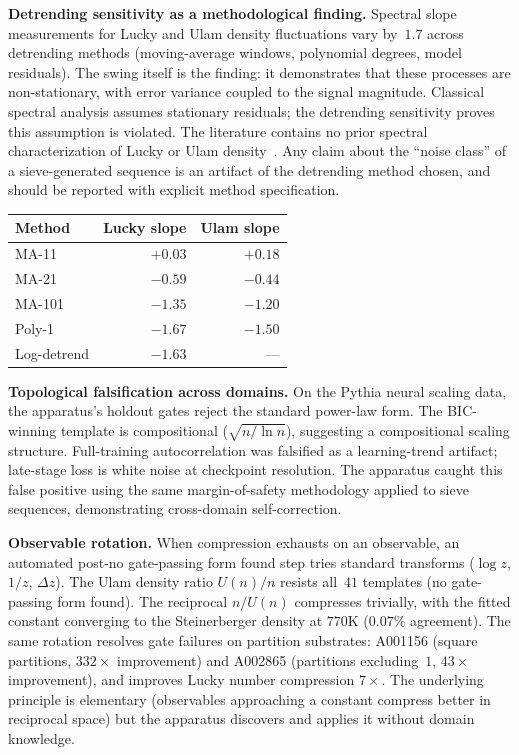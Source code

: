\documentclass[12pt]{article}
\begin{document}
\textbf{Detrending sensitivity as a methodological finding.} Spectral slope measurements for Lucky and Ulam density fluctuations vary by~$1.7$ across detrending methods (moving-average windows, polynomial degrees, model residuals). The swing itself is the finding: it demonstrates that these processes are non-stationary, with error variance coupled to the signal magnitude. Classical spectral analysis assumes stationary residuals; the detrending sensitivity proves this assumption is violated. The literature contains no prior spectral characterization of Lucky or Ulam density~\cite{wolf1997}. Any claim about the ``noise class'' of a sieve-generated sequence is an artifact of the detrending method chosen, and should be reported with explicit method specification.

\begin{center}
\small
\begin{tabular}{lrr}
\toprule
Method & Lucky slope & Ulam slope \\
\midrule
MA-11 & $+0.03$ & $+0.18$ \\
MA-21 & $-0.59$ & $-0.44$ \\
MA-101 & $-1.35$ & $-1.20$ \\
Poly-1 & $-1.67$ & $-1.50$ \\
Log-detrend & $-1.63$ & --- \\
\bottomrule
\end{tabular}
\end{center}

\textbf{Topological falsification across domains.} On the Pythia neural scaling data, the apparatus's holdout gates reject the standard power-law form. The BIC-winning template is compositional ($\sqrt{n/\ln n}$), suggesting a compositional scaling structure. Full-training autocorrelation was falsified as a learning-trend artifact; late-stage loss is white noise at checkpoint resolution. The apparatus caught this false positive using the same margin-of-safety methodology applied to sieve sequences, demonstrating cross-domain self-correction.

\textbf{Observable rotation.} When compression exhausts on an observable, an automated post-no gate-passing form found step tries standard transforms ($\log z$, $1/z$, $\Delta z$). The Ulam density ratio $U(n)/n$ resists all~$41$ templates (no gate-passing form found). The reciprocal $n/U(n)$ compresses trivially, with the fitted constant converging to the Steinerberger density at $770$K ($0.07\%$ agreement). The same rotation resolves gate failures on partition substrates: A001156 (square partitions, $332\times$ improvement) and A002865 (partitions excluding~$1$, $43\times$ improvement), and improves Lucky number compression $7\times$. The underlying principle is elementary (observables approaching a constant compress better in reciprocal space) but the apparatus discovers and applies it without domain knowledge.
\end{document}
